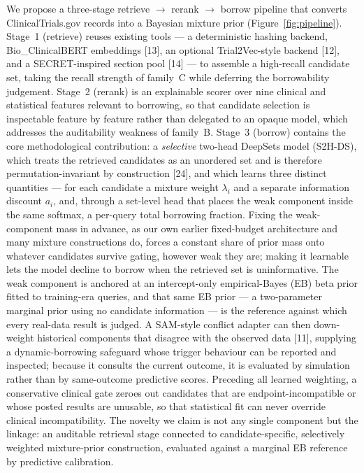 \documentclass[11pt]{article}
\begin{document}
We propose a three-stage retrieve $\rightarrow$ rerank $\rightarrow$ borrow
pipeline that converts ClinicalTrials.gov records into a Bayesian mixture prior
(Figure~\ref{fig:pipeline}). Stage~1 (retrieve) reuses existing tools --- a
deterministic hashing backend, Bio\_ClinicalBERT embeddings [13], an optional
Trial2Vec-style backend [12], and a SECRET-inspired section pool [14] --- to
assemble a high-recall candidate set, taking the recall strength of family~C
while deferring the borrowability judgement. Stage~2 (rerank) is an explainable
scorer over nine clinical and statistical features relevant to borrowing, so
that candidate selection is inspectable feature by feature rather than
delegated to an opaque model, which addresses the auditability weakness of
family~B. Stage~3 (borrow) contains the core methodological contribution: a
\emph{selective} two-head DeepSets model (S2H-DS), which treats the retrieved
candidates as an unordered set and is therefore permutation-invariant by
construction [24], and which learns three distinct quantities --- for each
candidate a mixture weight $\lambda_i$ and a separate information discount
$a_i$, and, through a set-level head that places the weak component inside the
same softmax, a per-query total borrowing fraction. Fixing the weak-component
mass in advance, as our own earlier fixed-budget architecture and many mixture
constructions do, forces a constant share of prior mass onto whatever
candidates survive gating, however weak they are; making it learnable lets the
model decline to borrow when the retrieved set is uninformative. The weak
component is anchored at an intercept-only empirical-Bayes (EB) beta prior
fitted to training-era queries, and that same EB prior --- a two-parameter
marginal prior using no candidate information --- is the reference against
which every real-data result is judged. A
SAM-style conflict adapter can then down-weight historical components that
disagree with the observed data [11], supplying a dynamic-borrowing safeguard
whose trigger behaviour can be reported and inspected; because it consults the
current outcome, it is evaluated by simulation rather than by same-outcome
predictive scores. Preceding all
learned weighting, a conservative clinical gate zeroes out candidates that are
endpoint-incompatible or whose posted results are unusable, so that statistical
fit can never override clinical incompatibility. The novelty we claim is not
any single component but the linkage: an auditable retrieval stage connected to
candidate-specific, selectively weighted mixture-prior construction, evaluated
against a marginal EB reference by predictive calibration.
\end{document}
